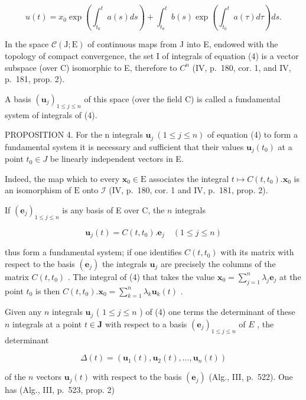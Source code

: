 \[
u (t) = x _ {0} \exp \left(\int_ {t _ {0}} ^ {t} a (s) d s\right) + \int_ {t _ {0}} ^ {t} b (s) \exp \left(\int_ {t _ {0}} ^ {t} a (\tau) d \tau\right) d s.\tag{12}
\]

In the space \(\mathcal{C}(\mathrm{J};\mathrm{E})\) of continuous maps from J into E, endowed with the topology of compact convergence, the set I of integrals of equation (4) is a vector subspace (over C) isomorphic to E, therefore to \(C^{n}\) (IV, p.~180, cor. 1, and IV, p.~181, prop. 2).

A basis \((\mathbf{u}_{j})_{1\leqslant j\leqslant n}\) of this space (over the field C) is called a fundamental system of integrals of (4).

PROPOSITION 4. For the n integrals \(\mathbf{u}_{j}\ (1 \leqslant j \leqslant n)\) of equation (4) to form a fundamental system it is necessary and sufficient that their values \(\mathbf{u}_{j}(t_{0})\) at a point \(t_{0} \in J\) be linearly independent vectors in E.

Indeed, the map which to every \(\mathbf{x}_0 \in \mathrm{E}\) associates the integral \(t \mapsto C(t, t_0). \mathbf{x}_0\) is an isomorphism of \(\mathrm{E}\) onto \(\mathcal{I}\) (IV, p.~180, cor. 1 and IV, p.~181, prop. 2).

If \(\left(\mathbf{e}_j\right)_{1\leqslant j\leqslant n}\) is any basis of E over C, the \(n\) integrals

\[
\mathbf {u} _ {j} (t) = C \left(t, t _ {0}\right). \mathbf {e} _ {j} \quad (1 \leqslant j \leqslant n)
\]

thus form a fundamental system; if one identifies \(C(t, t_0)\) with its matrix with respect to the basis \((\mathbf{e}_j)\) the integrals \(\mathbf{u}_j\) are precisely the columns of the matrix \(C(t, t_0)\) . The integral of (4) that takes the value \(\mathbf{x}_0 = \sum_{j=1}^{n} \lambda_j \mathbf{e}_j\) at the point \(t_0\) is then \(C(t, t_0). \mathbf{x}_0 = \sum_{k=1}^{n} \lambda_k \mathbf{u}_k(t)\) .

Given any \(n\) integrals \(\mathbf{u}_j\) ( \(1 \leqslant j \leqslant n\) ) of (4) one terms the determinant of these \(n\) integrals at a point \(t \in \mathbf{J}\) with respect to a basis \((\mathbf{e}_j)_{1 \leqslant j \leqslant n}\) of \(E\) , the determinant

\[
\Delta (t) = \left(\mathbf {u} _ {1} (t), \mathbf {u} _ {2} (t), \dots , \mathbf {u} _ {n} (t)\right)\tag{13}
\]

of the \(n\) vectors \(\mathbf{u}_j(t)\) with respect to the basis \((\mathbf{e}_j)\) (Alg., III, p.~522). One has (Alg., III, p.~523, prop. 2)

